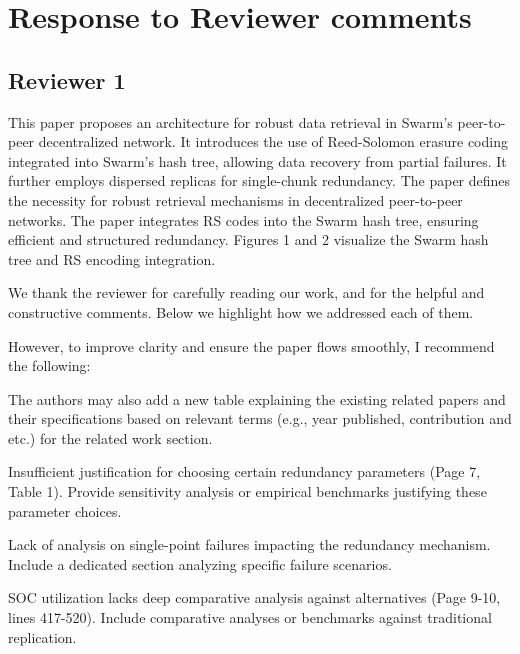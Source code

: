 \documentclass[11pt]{article}
\newcommand{\us}{\rm \setlength{\leftskip}{0.3cm} \setlength{\rightskip}{0.3cm}}
\newcommand{\them}{\it \setlength{\leftskip}{0cm} \setlength{\rightskip}{0cm}}
\begin{document}
\us

\them


\section*{Response to Reviewer comments}

\subsection*{Reviewer 1}

\them

This paper proposes an architecture for robust data retrieval in Swarm's peer-to-peer decentralized network. It introduces the use of Reed-Solomon erasure coding integrated into Swarm's hash tree, allowing data recovery from partial failures. It further employs dispersed replicas for single-chunk redundancy. The paper defines the necessity for robust retrieval mechanisms in decentralized peer-to-peer networks. The paper integrates RS codes into the Swarm hash tree, ensuring efficient and structured redundancy. Figures 1 and 2 visualize the Swarm hash tree and RS encoding integration.

\us

We thank the reviewer for carefully reading our work, and for the helpful and constructive comments. Below we highlight how we addressed each of them.

\them

However, to improve clarity and ensure the paper flows smoothly, I recommend the following:

The authors may also add a new table explaining the existing related papers and their specifications based on relevant terms (e.g., year published, contribution and etc.) for the related work section.

\us

\them

Insufficient justification for choosing certain redundancy parameters (Page 7, Table 1). Provide sensitivity analysis or empirical benchmarks justifying these parameter choices.

\us

\them

Lack of analysis on single-point failures impacting the redundancy mechanism. Include a dedicated section analyzing specific failure scenarios.

\us

\them

SOC utilization lacks deep comparative analysis against alternatives (Page 9-10, lines 417-520). Include comparative analyses or benchmarks against traditional replication.
\end{document}
